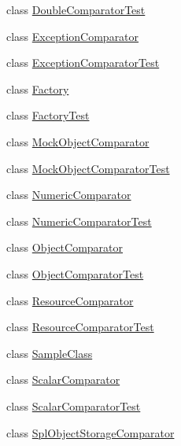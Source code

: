 \begin{DoxyCompactItemize}
class \mbox{\hyperlink{class_sebastian_bergmann_1_1_comparator_1_1_double_comparator_test}{Double\+Comparator\+Test}}
\item 
class \mbox{\hyperlink{class_sebastian_bergmann_1_1_comparator_1_1_exception_comparator}{Exception\+Comparator}}
\item 
class \mbox{\hyperlink{class_sebastian_bergmann_1_1_comparator_1_1_exception_comparator_test}{Exception\+Comparator\+Test}}
\item 
class \mbox{\hyperlink{class_sebastian_bergmann_1_1_comparator_1_1_factory}{Factory}}
\item 
class \mbox{\hyperlink{class_sebastian_bergmann_1_1_comparator_1_1_factory_test}{Factory\+Test}}
\item 
class \mbox{\hyperlink{class_sebastian_bergmann_1_1_comparator_1_1_mock_object_comparator}{Mock\+Object\+Comparator}}
\item 
class \mbox{\hyperlink{class_sebastian_bergmann_1_1_comparator_1_1_mock_object_comparator_test}{Mock\+Object\+Comparator\+Test}}
\item 
class \mbox{\hyperlink{class_sebastian_bergmann_1_1_comparator_1_1_numeric_comparator}{Numeric\+Comparator}}
\item 
class \mbox{\hyperlink{class_sebastian_bergmann_1_1_comparator_1_1_numeric_comparator_test}{Numeric\+Comparator\+Test}}
\item 
class \mbox{\hyperlink{class_sebastian_bergmann_1_1_comparator_1_1_object_comparator}{Object\+Comparator}}
\item 
class \mbox{\hyperlink{class_sebastian_bergmann_1_1_comparator_1_1_object_comparator_test}{Object\+Comparator\+Test}}
\item 
class \mbox{\hyperlink{class_sebastian_bergmann_1_1_comparator_1_1_resource_comparator}{Resource\+Comparator}}
\item 
class \mbox{\hyperlink{class_sebastian_bergmann_1_1_comparator_1_1_resource_comparator_test}{Resource\+Comparator\+Test}}
\item 
class \mbox{\hyperlink{class_sebastian_bergmann_1_1_comparator_1_1_sample_class}{Sample\+Class}}
\item 
class \mbox{\hyperlink{class_sebastian_bergmann_1_1_comparator_1_1_scalar_comparator}{Scalar\+Comparator}}
\item 
class \mbox{\hyperlink{class_sebastian_bergmann_1_1_comparator_1_1_scalar_comparator_test}{Scalar\+Comparator\+Test}}
\item 
class \mbox{\hyperlink{class_sebastian_bergmann_1_1_comparator_1_1_spl_object_storage_comparator}{Spl\+Object\+Storage\+Comparator}}

\end{DoxyCompactItemize}
